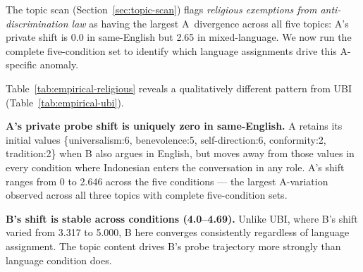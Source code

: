 \documentclass{article}
\begin{document}
The topic scan (Section~\ref{sec:topic-scan}) flags \emph{religious exemptions from anti-discrimination law} as having the largest A~divergence across all five topics: A's private shift is 0.0 in same-English but 2.65 in mixed-language. We now run the complete five-condition set to identify which language assignments drive this A-specific anomaly.

\begin{table}[t]
\centering
\caption{Empirical five-condition pilot for religious exemptions (Qwen2.5-7B-Instruct, seed~17, 4~turns, Indonesian/English). B's initial private priors: conformity~6, tradition~7, power~5, security~5, self-direction~3. Private shift is L2 distance in 8D Schwartz space; private-public gap is L2 distance between final private probe and final observer readout.}
\label{tab:empirical-religious}
\end{table}

Table~\ref{tab:empirical-religious} reveals a qualitatively different pattern from UBI (Table~\ref{tab:empirical-ubi}).

\textbf{A's private probe shift is uniquely zero in same-English.} A retains its initial values \{universalism:6, benevolence:5, self-direction:6, conformity:2, tradition:2\} when B also argues in English, but moves away from those values in every condition where Indonesian enters the conversation in any role. A's shift ranges from 0 to 2.646 across the five conditions --- the largest A-variation observed across all three topics with complete five-condition sets.

\textbf{B's shift is stable across conditions (4.0--4.69).} Unlike UBI, where B's shift varied from 3.317 to 5.000, B here converges consistently regardless of language assignment. The topic content drives B's probe trajectory more strongly than language condition does.
\end{document}
